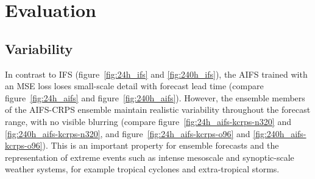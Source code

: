 \documentclass{article}
\begin{document}
\section{Evaluation}
\subsection{Variability}\label{variability}
In contrast to IFS (figure~\ref{fig:24h_ifs} and \ref{fig:240h_ifs}), the AIFS trained with an MSE loss loses small-scale detail with forecast lead time (compare figure~\ref{fig:24h_aifs} and figure~\ref{fig:240h_aifs}). However, the ensemble members of the AIFS-CRPS ensemble maintain realistic variability throughout the forecast range, with no visible blurring (compare figure~\ref{fig:24h_aifs-kcrps-n320} and \ref{fig:240h_aifs-kcrps-n320}, and figure~\ref{fig:24h_aifs-kcrps-o96} and \ref{fig:240h_aifs-kcrps-o96}). This is an important property for ensemble forecasts and the representation of extreme events such as intense mesoscale and synoptic-scale weather systems, for example tropical cyclones and extra-tropical storms.
\end{document}
